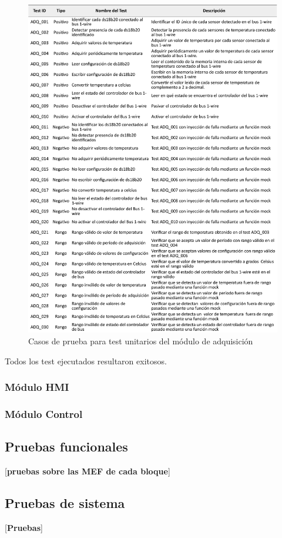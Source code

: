\begin{figure}[!htpb]
	\centering
	\includegraphics[width=\textwidth]{./Figures/TestADQ.pdf}
	\caption{Casos de prueba para test unitarios del módulo de adquisición}
	\label{fig:test_adquisición}
\end{figure}

Todos los test ejecutados resultaron exitosos.

\subsubsection{Módulo HMI}

\subsubsection{Módulo Control}

\subsection{Pruebas funcionales}
\label{subsec:pruebasFuncionales}


[\textbf{pruebas sobre las MEF de cada bloque}]

\subsection{Pruebas de sistema}
\label{subsec:pruebasSistema}

[\textbf{Pruebas}]
